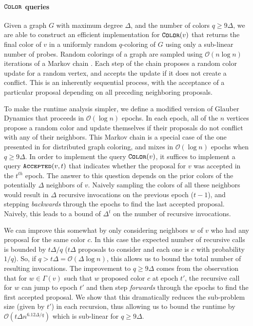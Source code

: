 \paragraph*{$\texttt{\textsc{Color}}$ queries}
\label{par:color_queries}
Given a graph $G$ with maximum degree $\Delta$, and the number of colors $q\ge 9\Delta$,
we are able to construct an efficient implementation for $\texttt{\textsc{Color}}(v)$ that returns the final color of $v$
in a uniformly random $q$-coloring of $G$ using only a sub-linear number of probes.
Random colorings of a graph are sampled using $\mathcal O(n\log n)$ iterations of a Markov chain \cite{glauber_survey}.
Each step of the chain proposes a random color update for a random vertex, and accepts the update if it does not create a conflict.
This is an inherently sequential process, with the acceptance of a particular proposal depending on all preceding neighboring proposals.

To make the runtime analysis simpler, we define a modified version of Glauber Dynamics that proceeds in $\mathcal O(\log n)$ epochs.
In each epoch, all of the $n$ vertices propose a random color and update themselves if their proposals do not conflict with any of their neighbors.
This Markov chain is a special case of the one presented in \cite{mohsen} for distributed graph coloring,
and mixes in $\mathcal O(\log n)$ epochs when $q\ge 9\Delta$.
In order to implement the query $\texttt{\textsc{Color}}(v)$, it suffices to implement a query $\texttt{\textsc{Accepted}}(v,t)$
that indicates whether the proposal for $v$ was accepted in the $t^{th}$ epoch.
The answer to this question depends on the prior colors of the potentially $\Delta$ neighbors of $v$.
Naively sampling the colors of all these neighbors would result in $\Delta$ recursive invocations on the previous epoch ($t-1$),
and stepping \emph{backwards} through the epochs to find the last accepted proposal.
Naively, this leads to a bound of $\Delta^t$ on the number of recursive invocations.

We can improve this somewhat by only considering neighbors $w$ of $v$ who had any proposal for the same color $c$.
In this case the expected number of recursive calls is bounded by $t\Delta/q$
($t\Delta$ proposals to consider and each one is $c$ with probability $1/q$).
So, if $q > t\Delta = \mathcal O(\Delta\log n)$, this allows us to bound the total number of resulting invocations.
The improvement to $q\ge 9\Delta$ comes from the observation that for $w\in\Gamma(v)$ such that $w$ proposed color $c$ at epoch $t'$,
the recursive call for $w$ can jump to epoch $t'$ and then step \emph{forwards} through the epochs to find the first accepted proposal.
We show that this dramatically reduces the sub-problem size (given by $t'$) in each recursion,
thus allowing us to bound the runtime by $\mathcal O\left(t\Delta n^{6.12\Delta/q}\right)$ which is sub-linear for $q \ge 9\Delta$.
